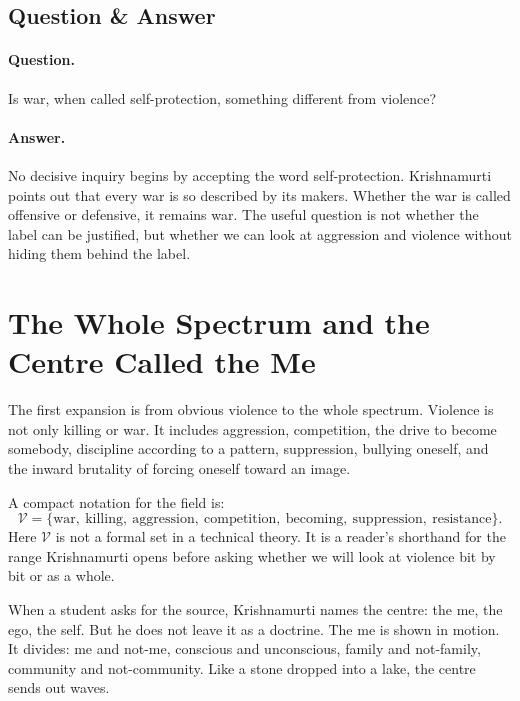 \subsection{Question \& Answer}

\paragraph{Question.}
Is war, when called self-protection, something different from violence?

\paragraph{Answer.}
No decisive inquiry begins by accepting the word self-protection. Krishnamurti points out that every war is so described by its makers. Whether the war is called offensive or defensive, it remains war. The useful question is not whether the label can be justified, but whether we can look at aggression and violence without hiding them behind the label.

\section{The Whole Spectrum and the Centre Called the Me}

The first expansion is from obvious violence to the whole spectrum. Violence is not only killing or war. It includes aggression, competition, the drive to become somebody, discipline according to a pattern, suppression, bullying oneself, and the inward brutality of forcing oneself toward an image.

A compact notation for the field is:
\begin{equation}
\mathcal{V}
=
\{\text{war},\ \text{killing},\ \text{aggression},\ \text{competition},\ \text{becoming},\ \text{suppression},\ \text{resistance}\}.
\end{equation}
Here \(\mathcal{V}\) is not a formal set in a technical theory. It is a reader's shorthand for the range Krishnamurti opens before asking whether we will look at violence bit by bit or as a whole.

When a student asks for the source, Krishnamurti names the centre: the me, the ego, the self. But he does not leave it as a doctrine. The me is shown in motion. It divides: me and not-me, conscious and unconscious, family and not-family, community and not-community. Like a stone dropped into a lake, the centre sends out waves.

